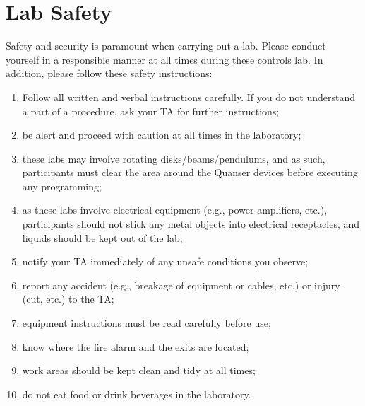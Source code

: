 \documentclass[12pt]{report}
\begin{document}
\newpage
\section{Lab Safety} \label{section:safety}
Safety and security is paramount when carrying out a lab. Please conduct yourself in a responsible manner at all times during these controls lab. In addition, please follow these safety instructions:

\begin{enumerate}
\item Follow all written and verbal instructions carefully.  If you do not understand a part of a procedure, ask your TA for further instructions;
\item be alert and proceed with caution at all times in the laboratory;
\item these labs may involve rotating disks/beams/pendulums, and as such, participants must clear the area around the Quanser devices before executing any programming;
\item as these labs involve electrical equipment (e.g., power amplifiers, etc.), participants should not stick any metal objects into electrical receptacles, and liquids should be kept out of the lab;
\item notify your TA immediately of any unsafe conditions you observe;
\item report any accident (e.g., breakage of equipment or cables, etc.) or injury (cut, etc.) to the TA;
\item equipment instructions must be read carefully before use;
\item know where the fire alarm and the exits are located;
\item work areas should be kept clean and tidy at all times;
\item do not eat food or drink beverages in the laboratory.
\end{enumerate}
\end{document}
